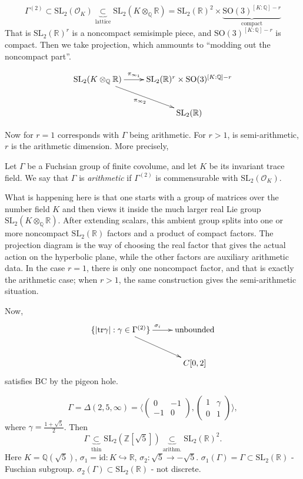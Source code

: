 $$
\Gamma^{(2)}
\subset \text{SL}_2(\mathcal{O}_K)
\underbrace{\subset}_{\text{lattice}}
\text{SL}_2(K \otimes_\mathbb{Q}\mathbb{R})
=\text{SL}_2(\mathbb{R})^2
\times 
\underbrace{\text{SO}(3)^{[K:\mathbb{Q}]-r}}_{
\text{compact}}
$$
That is $\text{SL}_2(\mathbb{R})^r$
is a noncompact semisimple piece,
and $\text{SO}(3)^{[K:\mathbb{Q}]-r}$
is compact. Then we take projection,
which ammounts to ``modding out the
noncompact part''.

  $$
  \xymatrix{
  \mathrm{SL}_2(K \otimes_{\mathbb{Q}}
  \mathbb{R}) \ar[r]^-{\pi_{\infty_1}}
  \ar[dr]_{\pi_{\infty_2}} &
  \mathrm{SL}_2(\mathbb{R})^r
\times\text{SO}(3)^{[K:\mathbb{Q}]-r} \\
  & \mathrm{SL}_2(\mathbb{R})
  }
  $$

Now for $r = 1$ corresponds with 
$\Gamma$ being arithmetic.
For  $r>1$, is semi-arithmetic,
$r$ is the arithmetic dimension.
More precisely,

\begin{definition}
\label{definition-arithmetic-group}
Let $\Gamma$ be a Fuchsian group of finite
covolume, and let $K$ be its invariant trace
field. We say that $\Gamma$ is
{\it arithmetic} if $\Gamma^{(2)}$ is
commensurable with $\mathrm{SL}_2(\mathcal{O}_K)$.
\end{definition}

What is happening here is that one starts
with a group of matrices over the number
field $K$ and then views it inside the much
larger real Lie group
$\mathrm{SL}_2(K \otimes_\mathbb{Q}\mathbb{R})$.
After extending scalars, this ambient group
splits into one or more noncompact
$\mathrm{SL}_2(\mathbb{R})$ factors and a
product of compact factors. The projection
diagram is the way of choosing the real
factor that gives the actual action on the
hyperbolic plane, while the other factors are
auxiliary arithmetic data. In the case
$r=1$, there is only one noncompact factor,
and that is exactly the arithmetic case;
when $r>1$, the same construction gives the
semi-arithmetic situation.

\medskip\noindent
Now,
$$
\xymatrix{
\{|\text{tr}\gamma|:\gamma \in \Gamma^{(2)}\}
\ar[r]^{\sigma_i}\ar[dr]&  \text{unbounded}\\
&C[0,2]
}
$$
satisfies BC by the pigeon hole.

\begin{example}
\label{example-golden-triangle}
$$
\Gamma = \Delta(2,5,\infty)
=\langle \begin{pmatrix}0&-1\\
-1&0\end{pmatrix},
\begin{pmatrix}1&\gamma\\ 0&1\end{pmatrix}
\rangle,
$$
where $\gamma=\frac{1+\sqrt{5}}{2}$.
Then
$$
\Gamma\underbrace{\subset}_{\text{thin}}
\text{SL}_2(\mathbb{Z}[\sqrt{5}])
\underbrace{\subset}_{\text{arithm.}}
\text{SL}_2(\mathbb{R})^2.
$$
Here $K=\mathbb{Q}(\sqrt{5})$,
$\sigma_1=\text{id}:K \hookrightarrow 
\mathbb{R}$,
$\sigma_2:\sqrt{5} \to -\sqrt{5}$.
$\sigma_1(\Gamma) = \Gamma
\subset\text{SL}_2(\mathbb{R})$ - Fuschian
subgroup.
$\sigma_2(\Gamma)\subset
\text{SL}_2(\mathbb{R})$ - not discrete.
\end{example}

